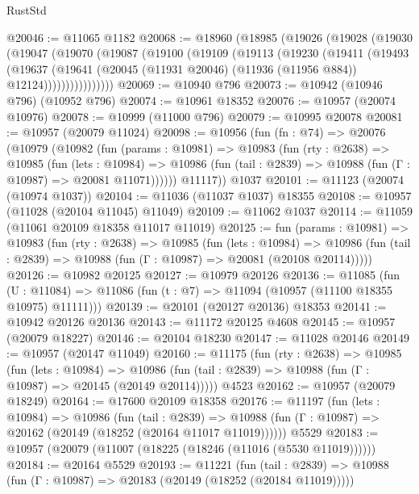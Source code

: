 \begin{lexlean}{RustStd}
\begin{coremodule}
{\begin{coremodule}
{{{{{{{{{{{{{{{{{{{{{{{{{{{{{{{{{@20046 := @11065 @1182
@20068 := @18960
    (@18985
      (@19026
        (@19028
          (@19030
            (@19047
              (@19070
                (@19087
                  (@19100
                    (@19109
                      (@19113
                        (@19230
                          (@19411
                            (@19493
                              (@19637
                                (@19641
                                  (@20045
                                    (@11931 @20046)
                                    (@11936 (@11956 @884))
                                    @12124))))))))))))))))
@20069 := @10940 @796
@20073 := @10942 (@10946 @796) (@10952 @796)
@20074 := @10961 @18352
@20076 := @10957 (@20074 @10976)
@20078 := @10999 (@11000 @796)
@20079 := @10995 @20078
@20081 := @10957 (@20079 @11024)
@20098 := @10956
    (fun (fn : @74) =>
    @20076
      (@10979
        (@10982
          (fun (params : @10981) =>
          @10983
            (fun (rty : @2638) =>
            @10985
              (fun (lets : @10984) =>
              @10986 (fun (tail : @2839) => @10988 (fun (Γ : @10987) => @20081 @11071))))))
        @11117))
    @1037
@20101 := @11123 (@20074 (@10974 @1037))
@20104 := @11036 (@11037 @1037) @18355
@20108 := @10957 (@11028 (@20104 @11045) @11049)
@20109 := @11062 @1037
@20114 := @11059 (@11061 @20109 @18358 @11017 @11019)
@20125 := fun (params : @10981) =>
  @10983
    (fun (rty : @2638) =>
    @10985
      (fun (lets : @10984) =>
      @10986 (fun (tail : @2839) => @10988 (fun (Γ : @10987) => @20081 (@20108 @20114)))))
@20126 := @10982 @20125
@20127 := @10979 @20126
@20136 := @11085
    (fun (U : @11084) => @11086 (fun (t : @7) => @11094 (@10957 (@11100 @18355 @10975) @11111)))
@20139 := @20101 (@20127 @20136) @18353
@20141 := @10942 @20126 @20136
@20143 := @11172 @20125 @4608
@20145 := @10957 (@20079 @18227)
@20146 := @20104 @18230
@20147 := @11028 @20146
@20149 := @10957 (@20147 @11049)
@20160 := @11175
    (fun (rty : @2638) =>
    @10985
      (fun (lets : @10984) =>
      @10986 (fun (tail : @2839) => @10988 (fun (Γ : @10987) => @20145 (@20149 @20114)))))
    @4523
@20162 := @10957 (@20079 @18249)
@20164 := @17600 @20109 @18358
@20176 := @11197
    (fun (lets : @10984) =>
    @10986
      (fun (tail : @2839) =>
      @10988 (fun (Γ : @10987) => @20162 (@20149 (@18252 (@20164 @11017 @11019))))))
    @5529
@20183 := @10957 (@20079 (@11007 (@18225 (@18246 (@11016 (@5530 @11019))))))
@20184 := @20164 @5529
@20193 := @11221
    (fun (tail : @2839) => @10988 (fun (Γ : @10987) => @20183 (@20149 (@18252 (@20184 @11019)))))
}}}}}}}}}}}}}}}}}}}}}}}}}}}}}}}}}
\end{coremodule}}
\end{coremodule}
\end{lexlean}
